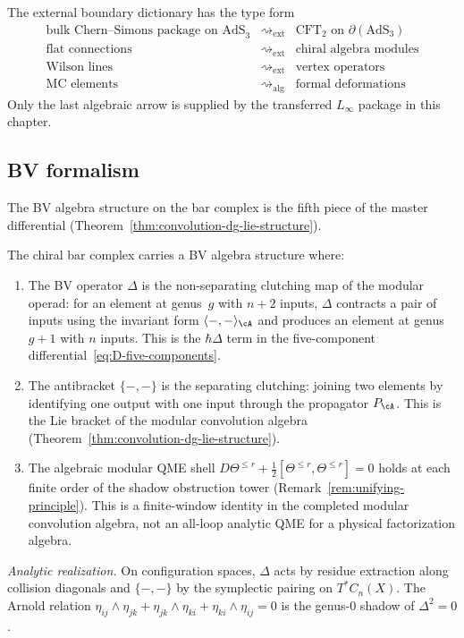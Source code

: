 The external boundary dictionary has the type form
\[
\begin{array}{ccc}
\text{bulk Chern--Simons package on AdS}_3
& \rightsquigarrow_{\mathrm{ext}} &
\text{CFT}_2 \text{ on } \partial(\text{AdS}_3) \\
\text{flat connections} & \rightsquigarrow_{\mathrm{ext}} &
\text{chiral algebra modules} \\
\text{Wilson lines} & \rightsquigarrow_{\mathrm{ext}} &
\text{vertex operators} \\
\text{MC elements} & \rightsquigarrow_{\mathrm{alg}} &
\text{formal deformations}
\end{array}
\]
Only the last algebraic arrow is supplied by the transferred
$L_\infty$ package in this chapter.

\subsection{BV formalism}

The BV algebra structure on the bar complex is the fifth piece of the
master differential
(Theorem~\ref{thm:convolution-dg-lie-structure}).

\begin{theorem}
\label{thm:bv-structure-bar}
The chiral bar complex carries a BV algebra structure where:
\begin{enumerate}
\item The BV operator $\Delta$ is the non-separating clutching map
of the modular operad: for an element at genus~$g$ with $n+2$
inputs, $\Delta$ contracts a pair of inputs using the invariant
form $\langle -, - \rangle_\cA$ and produces an element at
genus~$g+1$ with $n$ inputs. This is the $\hbar\Delta$ term in
the five-component differential~\eqref{eq:D-five-components}.
\item The antibracket $\{-,-\}$ is the separating clutching:
joining two elements by identifying one output with one input
through the propagator $P_\cA$. This is the Lie bracket of the
modular convolution algebra
(Theorem~\ref{thm:convolution-dg-lie-structure}).
\item The algebraic modular QME shell
$D\Theta^{\leq r} + \tfrac12[\Theta^{\leq r},\Theta^{\leq r}] = 0$
holds at each finite order of the shadow obstruction tower
\textup{(}Remark~\textup{\ref{rem:unifying-principle})}. This is a
finite-window identity in the completed modular convolution algebra,
not an all-loop analytic QME for a physical factorization algebra.
\end{enumerate}

\emph{Analytic realization.} On configuration spaces,
$\Delta$ acts by residue extraction along collision diagonals and
$\{-,-\}$ by the symplectic pairing on $T^*C_n(X)$. The Arnold
relation
$\eta_{ij} \wedge \eta_{jk} + \eta_{jk} \wedge \eta_{ki}
+ \eta_{ki} \wedge \eta_{ij} = 0$ is the genus-$0$ shadow of
$\Delta^2 = 0$.
\end{theorem}

